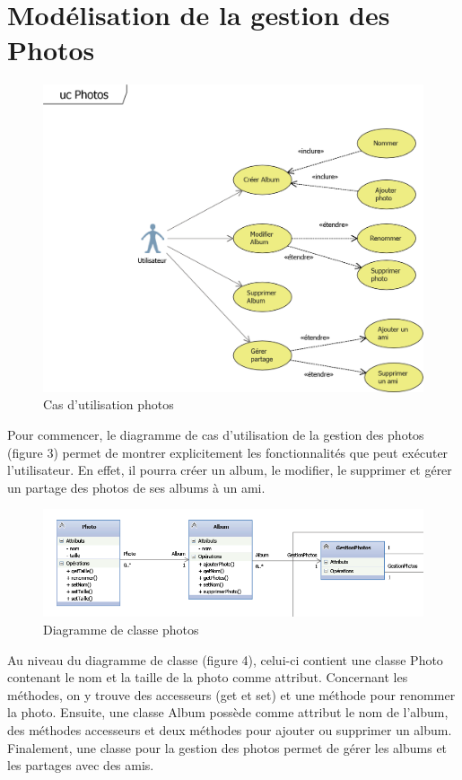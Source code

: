 \documentclass[11pt]{article}
\begin{document}
\newpage
\section{Modélisation de la gestion des Photos}
\begin{figure}[!h]
        \centering \includegraphics[scale=1]{ucPhotos.png}
        \caption{Cas d'utilisation photos}
         \label{fig:ucPhotos}
\end{figure}
Pour commencer, le diagramme de cas d’utilisation de la gestion des photos (figure 3) permet de montrer explicitement les fonctionnalités que peut exécuter l’utilisateur. En effet, il pourra créer un album, le modifier, le supprimer et gérer un partage des photos de ses albums à un ami. 
\begin{figure}[!h]
        \centering \includegraphics[scale=1]{photo.png}
        \caption{Diagramme de classe photos}
         \label{fig:photos}
\end{figure}
Au niveau du diagramme de classe (figure 4), celui-ci contient une classe Photo contenant  le nom et la taille de la photo comme attribut. Concernant les méthodes, on y trouve des accesseurs (get et set) et une méthode pour renommer la photo. Ensuite, une classe Album possède comme attribut le nom de l’album, des méthodes accesseurs et deux méthodes pour ajouter ou supprimer un album. Finalement, une classe pour la gestion des photos permet de gérer les albums et les partages avec des amis.
\end{document}
